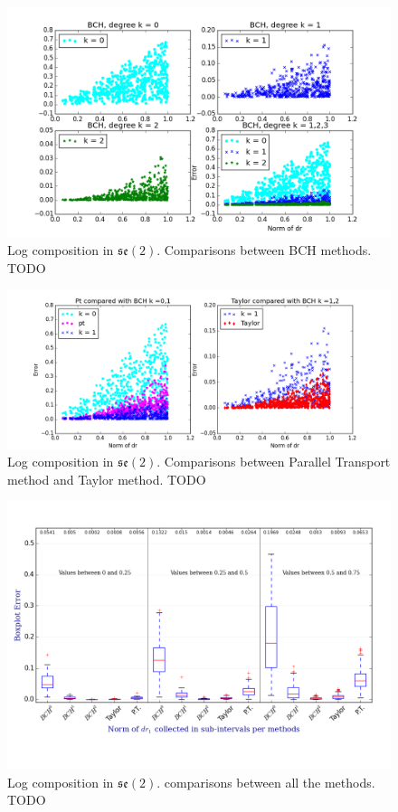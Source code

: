 \begin{figure}[!ht]
	\hspace{-1cm}
	\includegraphics[scale=0.65]{figures/se2_four_BCH.png}
	\caption{Log composition in $\mathfrak{se}(2)$. Comparisons between BCH methods. TODO}
	\label{fig:se2_four_BCH}
\end{figure}

\begin{figure}[!ht]
	\hspace{-2cm}
	\includegraphics[scale=0.6]{figures/se2_pt_taylor.png}
	\caption{Log composition in $\mathfrak{se}(2)$. Comparisons between Parallel Transport method and Taylor method. TODO}
	\label{fig:se2_pt_taylor}
\end{figure}


\begin{figure}[!ht]
	\hspace{-2cm}
	\includegraphics[scale=0.75]{figures/se2_boxplot.png}
	\caption{Log composition in $\mathfrak{se}(2)$. comparisons between all the methods. TODO}
	\label{fig:se2_boxplot}
\end{figure}


